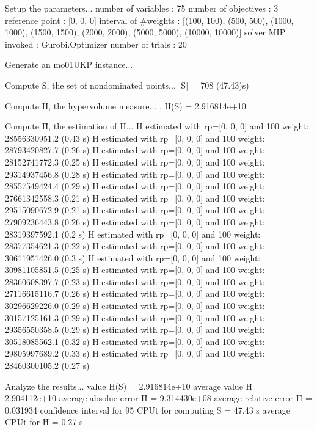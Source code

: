 Setup the parameters...
  number of variables  : 75
  number of objectives : 3
  reference point      : [0, 0, 0]
  interval of #weights : [(100, 100), (500, 500), (1000, 1000), (1500, 1500), (2000, 2000), (5000, 5000), (10000, 10000)]
  solver MIP invoked   : Gurobi.Optimizer
  number of trials     : 20

Generate an mo01UKP instance...

Compute S, the set of nondominated points...
  |S|  = 708 (47.43)s)

Compute H, the hypervolume measure...
. H(S) = 2.916814e+10

Compute H̃, the estimation of H...
  H estimated with rp=[0, 0, 0] and 100 weight:  28556330951.2  (0.43 s)
  H estimated with rp=[0, 0, 0] and 100 weight:  28793420827.7  (0.26 s)
  H estimated with rp=[0, 0, 0] and 100 weight:  28152741772.3  (0.25 s)
  H estimated with rp=[0, 0, 0] and 100 weight:  29314937456.8  (0.28 s)
  H estimated with rp=[0, 0, 0] and 100 weight:  28557549424.4  (0.29 s)
  H estimated with rp=[0, 0, 0] and 100 weight:  27661342558.3  (0.21 s)
  H estimated with rp=[0, 0, 0] and 100 weight:  29515090672.9  (0.21 s)
  H estimated with rp=[0, 0, 0] and 100 weight:  27909236443.8  (0.26 s)
  H estimated with rp=[0, 0, 0] and 100 weight:  28319397592.1  (0.2 s)
  H estimated with rp=[0, 0, 0] and 100 weight:  28377354621.3  (0.22 s)
  H estimated with rp=[0, 0, 0] and 100 weight:  30611951426.0  (0.3 s)
  H estimated with rp=[0, 0, 0] and 100 weight:  30981105851.5  (0.25 s)
  H estimated with rp=[0, 0, 0] and 100 weight:  28360608397.7  (0.23 s)
  H estimated with rp=[0, 0, 0] and 100 weight:  27116615116.7  (0.26 s)
  H estimated with rp=[0, 0, 0] and 100 weight:  30296629226.0  (0.29 s)
  H estimated with rp=[0, 0, 0] and 100 weight:  30157125161.3  (0.29 s)
  H estimated with rp=[0, 0, 0] and 100 weight:  29356550358.5  (0.29 s)
  H estimated with rp=[0, 0, 0] and 100 weight:  30518085562.1  (0.32 s)
  H estimated with rp=[0, 0, 0] and 100 weight:  29805997689.2  (0.33 s)
  H estimated with rp=[0, 0, 0] and 100 weight:  28460300105.2  (0.27 s)

Analyze the results...
  value H(S)                  = 2.916814e+10 
  average value H̃             = 2.904112e+10 
  average absolue error H̃     = 9.314430e+08 
  average relative error H̃    = 0.031934 
  confidence interval for 95%
  CPUt for computing S         = 47.43 s
  average CPUt for H̃           = 0.27 s

